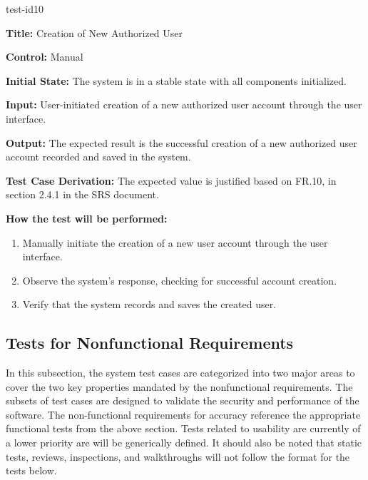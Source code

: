 \documentclass[12pt, titlepage]{article}
\begin{document}
\begin{itemize}
    \begin{item}
        test-id10
        \begin{mdframed}[linewidth=0.5mm]
            \textbf{Title:} Creation of New Authorized User \par
            \textbf{Control:} Manual \par
            \textbf{Initial State:} The system is in a stable state with all components initialized. \par
            \textbf{Input:} User-initiated creation of a new authorized user account through the user interface. \par
            \textbf{Output:} The expected result is the successful creation of a new authorized user account recorded and saved in the system. \par
            \textbf{Test Case Derivation:} The expected value is justified based on FR.10, in section 2.4.1 in the SRS document. \par
            \textbf{How the test will be performed:}
            \begin{enumerate}[noitemsep]
                \item Manually initiate the creation of a new user account through the user interface.
                \item Observe the system's response, checking for successful account creation.
                \item Verify that the system records and saves the created user.
            \end{enumerate}
        \end{mdframed}
    \end{item}
\end{itemize}

\pagebreak
\subsection{Tests for Nonfunctional Requirements}
In this subsection, the system test cases are categorized into two major areas to cover the two key properties mandated by the nonfunctional requirements. The subsets of test cases are designed to validate the security and performance of the software. The non-functional requirements for accuracy reference the appropriate functional tests from the above section. Tests related to usability are currently of a lower priority are will be generically defined. It should also be noted that static tests, reviews, inspections, and walkthroughs will not follow the format for the tests below.
\end{document}
